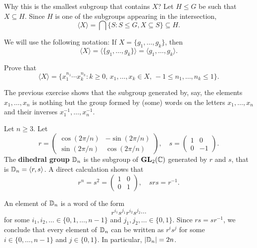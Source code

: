 Why this is the smallest subgroup that contains $X$? 
Let $H\leq G$ be such that 
$X\subseteq H$. Since $H$ is one of the subgroups appearing
in the intersection, 
\[
        \langle X\rangle=\bigcap\{S:S\leq G,X\subseteq S\}\subseteq H.        
\]

We will use the following notation:
If $X=\{g_1,\dots,g_k\}$, then 
\[
\langle
X\rangle=\langle\{g_1,\dots,g_k\}\rangle=\langle g_1,\dots,g_k\rangle.
\]

\begin{exercise}
Prove that 
\[
        \langle X\rangle=\{x_1^{n_1}\cdots x_k^{n_k}:k\geq0,\,x_1,\dots,x_k\in X,\,-1\leq n_1,\dots,n_k\leq 1\}.
\]
\end{exercise}

The previous exercise shows that
the subgroup generated by, say, the elements 
$x_1,\dots,x_n$ is nothing but the 
group formed by (some) words on the letters 
$x_1,\dots,x_n$ and their inverses 
$x_1^{-1},\dots,x_n^{-1}$. 

\begin{example}
Let $n\geq3$. Let 
\[
r=\begin{pmatrix}
\cos(2\pi/n) & -\sin(2\pi/n)\\
\sin(2\pi/n) & \cos(2\pi/n)
\end{pmatrix},
\quad
s=\begin{pmatrix}
        1 & 0\\
        0 & -1
\end{pmatrix}.
\]
The \textbf{dihedral group} $\mathbb{D}_n$ is the subgroup of
$\mathbf{GL}_2(\mathbb{C})$ generated by $r$ and $s$,
that is $\mathbb{D}_n=\langle r,s\rangle$. A direct calculation shows that 
\[
r^n=s^2=\begin{pmatrix}
        1&0\\
        0&1
\end{pmatrix},
\quad
srs=r^{-1}.
\]

An element of $\mathbb{D}_n$ is a word of the form 
\[
r^{i_1}s^{j_1}r^{i_2}s^{j_2}\cdots
\]
for some 
 $i_1,i_2,\dots\in\{0,1,\dots,n-1\}$ and 
$j_1,j_2,\dots\in\{0,1\}$. Since $rs=sr^{-1}$, we conclude that
every element of $\mathbb{D}_n$ can be written as $r^is^j$ 
for some $i\in\{0,\dots,n-1\}$ and $j\in\{0,1\}$. In particular, 
$|\mathbb{D}_n|=2n$.
\end{example}

